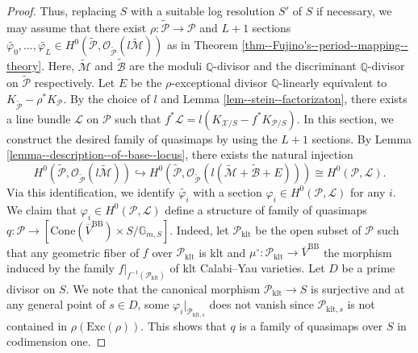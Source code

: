 \documentclass[10pt,a4paper]{amsart}
\begin{document}
\begin{proof}
Thus, replacing $S$ with a suitable log resolution $S'$ of $S$ if necessary, we may assume that there exist $\rho\colon\tilde{\mathcal{P}}\to\mathcal{P}$ and $L+1$ sections $\widetilde{\varphi_0},\ldots,\widetilde{\varphi_L}\in H^0(\tilde{\mathcal{P}},\mathcal{O}_{\widetilde{\mathcal{P}}}(l\widetilde{\mathcal{M}}))$ as in Theorem \ref{thm--Fujino's--period--mapping--theory}.
Here, $\widetilde{\mathcal{M}}$ and $\widetilde{\mathcal{B}}$ are the moduli $\mathbb{Q}$-divisor and the discriminant $\mathbb{Q}$-divisor on $\tilde{\mathcal{P}}$ respectively.
Let $E$ be the $\rho$-exceptional divisor $\mathbb{Q}$-linearly equivalent to $K_{\widetilde{\mathcal{P}}}-\rho^*K_{\mathcal{P}}$. 
By the choice of $l$ and Lemma \ref{lem--stein--factorizaton}, there exists a line bundle $\mathscr{L}$ on $\mathcal{P}$ such that $f^*\mathscr{L}=l(K_{\mathcal{X}/S}-f^*K_{\mathcal{P}/S})$.
In this section, we construct the desired family of quasimaps by using the $L+1$ sections.
By Lemma \ref{lemma--description--of--base--locus}, there exists the natural injection
\begin{equation}\tag{$\clubsuit$}\label{eq--injection-of--function}
H^0(\tilde{\mathcal{P}},\mathcal{O}_{\widetilde{\mathcal{P}}}(l\widetilde{\mathcal{M}}))\hookrightarrow H^0(\tilde{\mathcal{P}},\mathcal{O}_{\widetilde{\mathcal{P}}}(l(\widetilde{\mathcal{M}}+\widetilde{\mathcal{B}}+E)))\cong H^0(\mathcal{P},\mathscr{L}).
\end{equation}
Via this identification, we identify $\widetilde{\varphi_i}$ with a section $\varphi_i\in H^0(\mathcal{P},\mathscr{L})$ for any $i$.
We claim that $\varphi_i\in H^0(\mathcal{P},\mathscr{L})$ define a structure of family of quasimaps $q\colon \mathcal{P}\to[\mathrm{Cone}(\overline{V}^{\mathrm{BB}})\times S/\mathbb{G}_{m,S}]$.
Indeed, let $\mathcal{P}_{\mathrm{klt}}$ be the open subset of $\mathcal{P}$ such that any geometric fiber of $f$ over $\mathcal{P}_{\mathrm{klt}}$ is klt and $\mu^\circ\colon \mathcal{P}_{\mathrm{klt}}\to \overline{V}^{\mathrm{BB}}$ the morphism induced by the family $f|_{f^{-1}(\mathcal{P}_{\mathrm{klt}})}$ of klt Calabi--Yau varieties.
Let $D$ be a prime divisor on $S$.
We note that the canonical morphism $\mathcal{P}_{\mathrm{klt}}\to S$ is surjective and at any general point of $s\in D$, some $\varphi_{i}|_{\mathcal{P}_{\mathrm{klt},s}}$ does not vanish since $\mathcal{P}_{\mathrm{klt},s}$ is not contained in $\rho(\mathrm{Exc}(\rho))$.
This shows that $q$ is a family of quasimaps over $S$ in codimension one.

\end{proof}
\end{document}
